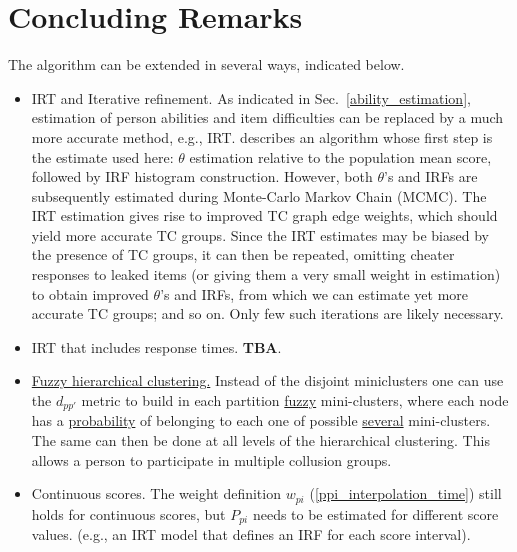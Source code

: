 \documentclass{article}
\begin{document}
\section{Concluding Remarks}
\label{remarks}
The algorithm can be extended in several ways, indicated below.
\begin{itemize}
	\item {IRT and Iterative refinement.} As indicated in Sec.~\ref{ability_estimation}, estimation of person abilities and item difficulties can be replaced by a much more accurate method, e.g., IRT. \cite{nirt} describes an algorithm whose first step is the estimate used here: $\theta$ estimation relative to the population mean score, followed by IRF histogram construction. However, both $\theta$'s and IRFs are subsequently estimated during Monte-Carlo Markov Chain (MCMC). The IRT estimation gives rise to improved TC graph edge weights, which should yield more accurate TC groups. Since the IRT estimates may be biased by the presence of TC groups, it can then be repeated, omitting cheater responses to leaked items (or giving them a very small weight in estimation) to obtain improved $\theta$'s and IRFs, from which we can estimate yet more accurate TC groups; and so on. Only few such iterations are likely necessary.
	\item {IRT that includes response times.} {\bf TBA}.
	\item \underline{Fuzzy hierarchical clustering.} Instead of the disjoint miniclusters one can use the $d_{pp'}$ metric to build in each partition \underline{fuzzy} mini-clusters, where each node has a \underline{probability} of belonging to each one of possible \underline{several} mini-clusters. The same can then be done at all levels of the hierarchical clustering. This allows a person to participate in multiple collusion groups.
	\item {Continuous scores.} The weight definition $w_{pi}$ (\ref{ppi_interpolation_time}) still holds for continuous scores, but $P_{pi}$ needs to be estimated for different score values. (e.g., an IRT model that defines an IRF for each score interval).



\end{itemize}
\end{document}

